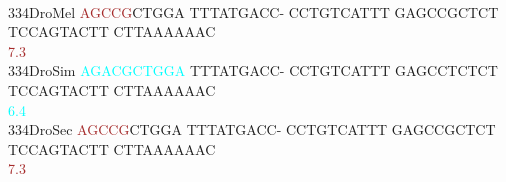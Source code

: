 \documentclass[11pt,twoside,reqno,a4paper]{article}
\begin{document}
{\\
334\hspace*{1\charwidth}DroMel	\textcolor{brown}{A}\textcolor{brown}{G}\textcolor{brown}{C}\textcolor{brown}{C}\textcolor{brown}{G}CTGGA	TTTATGACC-	CCTGTCATTT	GAGCCGCTCT	TCCAGTACTT	CTTAAAAAAC	\\
\hspace*{4\charwidth}\hspace*{7\charwidth}\hspace*{0\charwidth}\textcolor{brown}{7.3}\hspace*{1\charwidth}\hspace*{1\charwidth}\hspace*{1\charwidth}\hspace*{1\charwidth}\hspace*{1\charwidth}\hspace*{1\charwidth}\\
334\hspace*{1\charwidth}DroSim	\textcolor{cyan}{A}\textcolor{cyan}{G}\textcolor{cyan}{A}\textcolor{cyan}{C}\textcolor{cyan}{G}\textcolor{cyan}{C}\textcolor{cyan}{T}\textcolor{cyan}{G}\textcolor{cyan}{G}\textcolor{cyan}{A}	TTTATGACC-	CCTGTCATTT	GAGCCTCTCT	TCCAGTACTT	CTTAAAAAAC	\\
\hspace*{4\charwidth}\hspace*{7\charwidth}\hspace*{0\charwidth}\textcolor{cyan}{6.4}\hspace*{1\charwidth}\hspace*{1\charwidth}\hspace*{1\charwidth}\hspace*{1\charwidth}\hspace*{1\charwidth}\hspace*{1\charwidth}\\
334\hspace*{1\charwidth}DroSec	\textcolor{brown}{A}\textcolor{brown}{G}\textcolor{brown}{C}\textcolor{brown}{C}\textcolor{brown}{G}CTGGA	TTTATGACC-	CCTGTCATTT	GAGCCGCTCT	TCCAGTACTT	CTTAAAAAAC	\\
\hspace*{4\charwidth}\hspace*{7\charwidth}\hspace*{0\charwidth}\textcolor{brown}{7.3}\hspace*{1\charwidth}\hspace*{1\charwidth}\hspace*{1\charwidth}\hspace*{1\charwidth}\hspace*{1\charwidth}\hspace*{1\charwidth}\\
}
\end{document}

